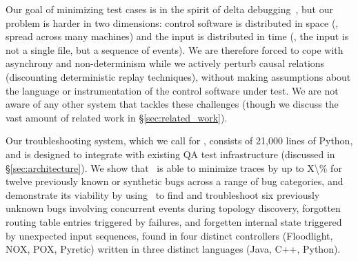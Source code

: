 Our goal of minimizing test cases is in the spirit of
delta debugging~\cite{Zeller:1999:YMP:318773.318946}, but our
problem is harder in two dimensions: control software is distributed in space (\ie,
spread across many machines) and the input is distributed in time (\ie, the
input is not a single file, but a sequence of events).
We are therefore forced to cope with asynchrony and non-determinism while
we actively perturb causal relations (discounting deterministic replay
techniques), without making assumptions about the language
or instrumentation of the control software under test.
We are not aware of any other system that tackles these
challenges (though we discuss the vast amount of related work in \S\ref{sec:related_work}).

Our troubleshooting system, which we call {\projectname} for \projectmeaning,
consists of 21,000 lines of Python, and is designed to
integrate with existing QA test infrastructure (discussed in
\S\ref{sec:architecture}). We show that \projectname~is able
to minimize traces by up to \num{X\%} for \num{twelve}
previously known or synthetic bugs across a range of bug categories,
and demonstrate its viability by using \projectname~to find and
troubleshoot \num{six} previously unknown bugs involving
concurrent events during topology discovery, forgotten routing table entries
triggered by failures, and forgetten internal state triggered by unexpected input
sequences, found in four distinct
controllers (Floodlight, NOX, POX, Pyretic) written in three distinct
languages (Java, C++, Python).

